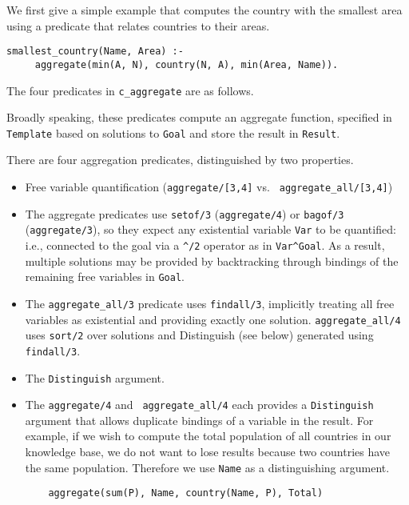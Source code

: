 We first give a simple example that computes the country with the
smallest area using a predicate that relates countries to their areas.

\begin{verbatim}        
smallest_country(Name, Area) :-
     aggregate(min(A, N), country(N, A), min(Area, Name)).
\end{verbatim}

\noindent
The four predicates in {\tt c\_aggregate} are as follows.
\begin{description}
%
Broadly speaking, these predicates compute an aggregate function,
specified in {\tt Template} based on solutions to {\tt Goal} and store
the result in {\tt Result}.

There are four aggregation predicates, distinguished by
two properties.

\begin{itemize}
\item Free variable quantification ({\tt aggregate/[3,4]} vs. {\tt
  aggregate\_all/[3,4]})
\bi
\item 
    The aggregate predicates use {\tt setof/3} ({\tt aggregate/4}) or
    {\tt bagof/3} ({\tt aggregate/3}), so they expect any existential
    variable {\tt Var} to be quantified: i.e., connected to the goal
    via a {\tt \verb|^|/2} operator as in {\tt Var\verb|^|Goal}.  As a result,
    multiple solutions may be provided by backtracking through
    bindings of the remaining free variables in {\tt Goal}.
%    
\item The {\tt aggregate\_all/3} predicate uses {\tt findall/3},
  implicitly treating all free variables as existential and providing
  exactly one solution. {\tt aggregate\_all/4} uses {\tt sort/2} over
  solutions and Distinguish (see below) generated using {\tt
    findall/3}.
  \ei
\item The {\tt Distinguish} argument.
\bi
  \item The {\tt aggregate/4} and {\tt
  aggregate\_all/4} each provides a {\tt Distinguish} argument that allows
  duplicate bindings of a variable in the result.
  For example, if we wish to compute the total population of all
  countries in our knowledge base, we do not want to lose results
  because two countries have the same population.  Therefore we use
  {\tt Name} as a distinguishing argument.
\begin{verbatim}
	aggregate(sum(P), Name, country(Name, P), Total)
\end{verbatim}
\ei
\end{itemize}  
\end{description}

